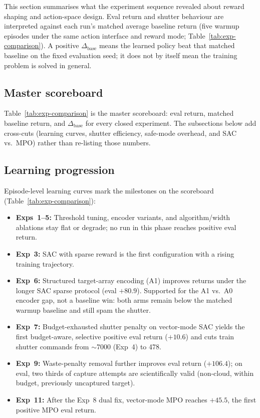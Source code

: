 \label{sec:results}

This section summarises what the experiment sequence revealed about reward shaping and action-space design.
Eval return and shutter behaviour are interpreted against each run's matched average baseline return (five warmup episodes under the same action interface and reward mode; Table~\ref{tab:exp-comparison}).
A positive $\Delta_\text{base}$ means the learned policy beat that matched baseline on the fixed evaluation seed; it does not by itself mean the training problem is solved in general.

\subsection{Master scoreboard}
\label{sec:results-aggregate}

Table~\ref{tab:exp-comparison} is the master scoreboard: eval return, matched baseline return, and $\Delta_\text{base}$ for every closed experiment.
The subsections below add cross-cuts (learning curves, shutter efficiency, safe-mode overhead, and SAC vs.\ MPO) rather than re-listing those numbers.

\subsection{Learning progression}
\label{sec:results-learning}

Episode-level learning curves mark the milestones on the scoreboard (Table~\ref{tab:exp-comparison}):

\begin{itemize}
  \item \textbf{Exps~1--5:} Threshold tuning, encoder variants, and algorithm/width ablations stay flat or degrade; no run in this phase reaches positive eval return.
  \item \textbf{Exp~3:} SAC with sparse reward is the first configuration with a rising training trajectory.
  \item \textbf{Exp~6:} Structured target-array encoding (A1) improves returns under the longer SAC sparse protocol (eval $+80.9$).
    Supported for the A1 vs.\ A0 encoder gap, not a baseline win: both arms remain below the matched warmup baseline and still spam the shutter.
  \item \textbf{Exp~7:} Budget-exhausted shutter penalty on vector-mode SAC yields the first budget-aware, selective positive eval return ($+10.6$) and cuts train shutter commands from $\sim$7000 (Exp~4) to 478.
  \item \textbf{Exp~9:} Waste-penalty removal further improves eval return ($+106.4$); on eval, two thirds of capture attempts are scientifically valid (non-cloud, within budget, previously uncaptured target).
  \item \textbf{Exp~11:} After the Exp~8 dual fix, vector-mode MPO reaches $+45.5$, the first positive MPO eval return.
\end{itemize}

